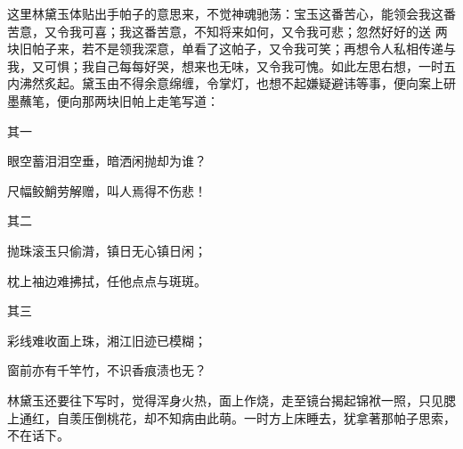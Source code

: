 \begin{parag}
    这里林黛玉体贴出手帕子的意思来，不觉神魂驰荡：宝玉这番苦心，能领会我这番苦意，又令我可喜；我这番苦意，不知将来如何，又令我可悲；忽然好好的送 两块旧帕子来，若不是领我深意，单看了这帕子，又令我可笑；再想令人私相传递与我，又可惧；我自己每每好哭，想来也无味，又令我可愧。如此左思右想，一时五内沸然炙起。黛玉由不得余意绵缠，令掌灯，也想不起嫌疑避讳等事，便向案上研墨蘸笔，便向那两块旧帕上走笔写道：
\end{parag}
\begin{poem}

    \begin{pl}

        其一
    \end{pl}
    \begin{pl}

        眼空蓄泪泪空垂，暗洒闲抛却为谁？
    \end{pl}
    \begin{pl}

        尺幅鲛鮹劳解赠，叫人焉得不伤悲！
    \end{pl}
    \emptypl
    \begin{pl}

        其二
    \end{pl}
    \begin{pl}

        抛珠滚玉只偷潸，镇日无心镇日闲；
    \end{pl}
    \begin{pl}

        枕上袖边难拂拭，任他点点与斑斑。
    \end{pl}

    \emptypl
    \begin{pl}

        其三
    \end{pl}
    \begin{pl}

        彩线难收面上珠，湘江旧迹已模糊；
    \end{pl}
    \begin{pl}

        窗前亦有千竿竹，不识香痕渍也无？
    \end{pl}

\end{poem}
\begin{parag}
    林黛玉还要往下写时，觉得浑身火热，面上作烧，走至镜台揭起锦袱一照，只见腮上通红，自羡压倒桃花，却不知病由此萌。一时方上床睡去，犹拿著那帕子思索，不在话下。
\end{parag}


